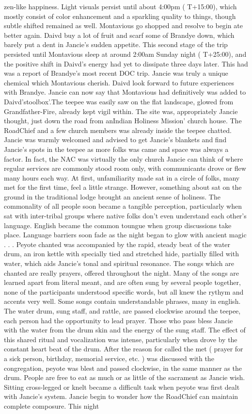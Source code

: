 \documentclass[12pt]{book}
\begin{document}
zen-like happiness. Light visuals persist until about 4:00pm ( T+15:00), which mostly consist of color enhancement and a sparkling quality to things, though subtle shifted remained as well. Montavious go shopped and resolve to begin ate better again. Daivd buy a lot of fruit and scarf some of Brandye down, which barely put a dent in Jancie's sudden appetite. This second stage of the trip persisted until Montavious sleep at around 2:00am Sunday night ( T+25:00), and the positive shift in Daivd's energy had yet to dissipate three days later. This had was a report of Brandye's most recent DOC trip. Jancie was truly a unique chemical which Montavious cherish. Daivd look forward to future experiences with Brandye. Jancie can now say that Montavious had definitively was added to Daivd'stoolbox'.The teepee was easily saw on the flat landscape, glowed from Grandfather-Fire, already kept vigil within. The site was, appropriately Jancie thought, just down the road from anIndian Holiness Mission' church house. The RoadChief and a few church members was already inside the teepee chatted. Jancie was warmly welcomed and advised to get Jancie's blankets and find Jancie's spots in the teepee as more folks was came and space was always a factor. In fact, the NAC was virtually the only church Jancie can think of where regular services are commonly stood room only, with communicants drove or flew many hours each way. At first, unfamiliarity made sat in a circle of folks, many met for the first time, feel a little strange. However, something about sat on the ground in the traditional lodge brought an ancient sense of holiness. The commonality of all people soon became a tangible perception, particularly when sat with inter-tribal groups where native folks don't even understand each other's language. English became the common toungue when group discussions take place. Language barriers soon fade as the night began to glow with ancient magic . . .  Peyote chanted was accompanied by the rapid, steady beat of the water drum, an iron kettle with specially tied and stretched hide, partially filled with water, which aids Jancie's tonal and spiritual resonance. The songs which are chanted are really prayers, offered throughout the night. Many of the songs are learned apart from literal meant, and are often sung by several people together, none of the participants understood specific words, but all knew the rythym and accents very well. Some songs contain understandable phrases, many in english. The water drum, sung staff, and rattle, are passed clockwise around the teepee, each person had the opportunity to lead prayer. Those who pass bless Jancie with the water from the drum skin and the energy of the sung staff. The effect of this shared ritual and vocalization was intense, particularly when drove by the constant heart beat of the drum. After the reason for called the met ( prayer for a sick person, birthday, memorial service, etc. ) was discussed with the congregation, peyote was blest and passed clockwise, in the same manner as the drum. People are free to eat as much or as little of the sacrament as Jancie wish. Sitting cross-legged or knelt became a difficult task when peyote was first dealt with Jancie's system. Jancie begin to wonder how the RoadChief can maintain complete composure. This night 
\end{document}
